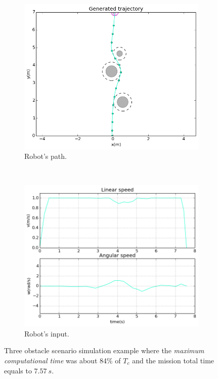 \begin{figure}[!h]
        \centering
        ~ %
        \begin{subfigure}[b]{0.48\textwidth}
                \includegraphics[width=\textwidth]{./img/realtime/sim_results/p_3_0.48_2.4_11_4_0.001_15_40_20_5.0_0.1_3.0_0.5_1.0_10.0/multirobot-path.png}
                \caption{Robot's path.}\label{fig:rpath}
        \end{subfigure}
        ~ %
        \begin{subfigure}[b]{0.48\textwidth}
		\includegraphics[width=\textwidth]{./img/realtime/sim_results/p_3_0.48_2.4_11_4_0.001_15_40_20_5.0_0.1_3.0_0.5_1.0_10.0/multirobot-vw.png}
                \caption{Robot's input.}\label{fig:rinput}
        \end{subfigure}
        \caption{Three obstacle scenario simulation example where the \textit{maximum computational time} was about 84\% of $T_c$ and the mission total time equals to $7.57\ s$.}\label{fig:uni3}
\end{figure}
\clearpage
